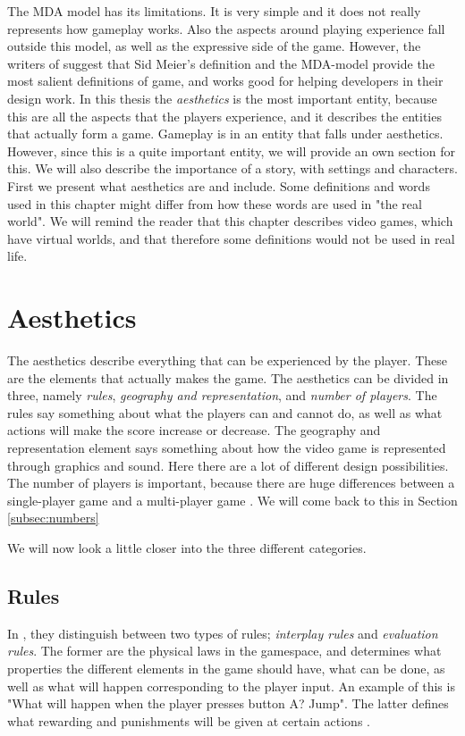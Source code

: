 The MDA model has its limitations. It is very simple and it does not really represents how gameplay works. Also the aspects around playing experience fall outside this model, as well as the expressive side of the game. However, the writers of \cite{understandingvg} suggest that Sid Meier's definition and the MDA-model provide the most salient definitions of game, and works good for helping developers in their design work. In this thesis the \emph{aesthetics} is the most important entity, because this are all the aspects that the players experience, and it describes the entities that actually form a game. Gameplay is in \cite{understandingvg} an entity that falls under aesthetics. However, since this is a quite important entity, we will provide an own section for this. We will also describe the importance of a story, with settings and characters. First we present what aesthetics are and include. Some definitions and words used in this chapter might differ from how these words are used in "the real world". We will remind the reader that this chapter describes video games, which have virtual worlds, and that therefore some definitions would not be used in real life.    


\section{Aesthetics}
The aesthetics describe everything that can be experienced by the player. These are the elements that actually makes the game. The aesthetics can be divided in three, namely \emph{rules}, \emph{geography and representation}, and \emph{number of players}. The rules say something about what the players can and cannot do, as well as what actions will make the score increase or decrease. The geography and representation element says something about how the video game is represented through graphics and sound. Here there are a lot of different design possibilities. The number of players is important, because there are huge differences between a single-player game and a multi-player game \cite{understandingvg}. We will come back to this in Section \ref{subsec:numbers}

We will now look a little closer into the three different categories.

\subsection{Rules}
In \cite{understandingvg}, they distinguish between two types of rules; \emph{interplay rules} and \emph{evaluation rules}. The former are the physical laws in the gamespace, and determines what properties the different elements in the game should have, what can be done, as well as what will happen corresponding to the player input. An example of this is "What will happen when the player presses button A? Jump". The latter defines what rewarding and punishments will be given at certain actions \cite{understandingvg}. 

